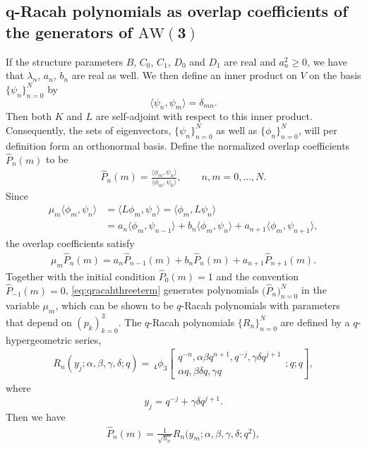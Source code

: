 \documentclass[pdftex]{sigma}
\numberwithin{equation}{section}
\newcommand{\aw}{\mathrm{AW}\!\left(3\right)}
\newcommand{\qhyp}[5]{\,_{#1}\phi_{#2} \left[ \begin{matrix}
		#3 \\ #4 \end{matrix};#5 \right]}
\begin{document}
\subsection[q-Racah polynomials as overlap coefficients of the generators of AW(3)]{$\boldsymbol{q}$-Racah polynomials as overlap coefficients of the generators of $\boldsymbol{\aw}$} \label{ssec:q-Racah pol}
If the structure parameters $B$, $C_0$, $C_1$, $D_0$ and $D_1$ are real and $a_n^2\geq 0$, we have that $\lambda_n$, $a_n$, $b_n$ are real as well. We then define an inner product on $V$ on the basis $\{\psi_n\}_{n=0}^N$ by
\[
\langle \psi_n,\psi_m\rangle=\delta_{mn}.
\]
Then both $K$ and $L$ are self-adjoint with respect to this inner product. Consequently, the sets of eigenvectors, $\{\psi_n\}_{n=0}^N$ as well as $\{\phi_n\}_{n=0}^N$, will per definition form an orthonormal basis. Define the normalized overlap coefficients $\widehat{P}_n(m)$ to be
\begin{align*}
	\widehat{P}_n(m)=\frac{\langle\phi_m,\psi_n\rangle}{\langle\phi_m,\psi_0\rangle},\qquad n,m=0,\ldots,N.
\end{align*}
Since
\begin{align}
\mu_m\langle\phi_m,\psi_n\rangle & =\langle L\phi_m, \psi_n\rangle =\langle \phi_m, L\psi_n\rangle\nonumber\\
		&=a_n\langle \phi_m,\psi_{n-1}\rangle+b_n\langle \phi_m,\psi_{n}\rangle+a_{n+1}\langle \phi_m,\psi_{n+1}\rangle, \label{eq:origin3term}
\end{align}
the overlap coefficients satisfy
\begin{gather}
	\mu_m \widehat{P}_{n}(m)= a_n \widehat{P}_{n-1}(m) + b_n \widehat{P}_{n}(m) + a_{n+1}\widehat{P}_{n+1}(m).\label{eq:qracahthreeterm}
\end{gather}
Together with the initial condition $\widehat{P}_0(m)=1$ and the convention $\widehat{P}_{-1}(m)=0$, \eqref{eq:qracahthreeterm} generates polynomials $\big(\widehat{P}_n\big)_{n=0}^N$ in the variable $\mu_m$, which can be shown \cite{Zhedanov1991} to be $q$-Racah polynomials with parameters that depend on $(p_k)_{k=0}^3$. The $q$-Racah polynomials $\{R_n\}_{n=0}^N$ are defined \cite{KLS} by a $q$-hypergeometric series,
\begin{gather}
	R_n(y_j;\alpha,\beta,\gamma,\delta;q)=\qhyp{4}{3}{q^{-n},\alpha\beta q^{n+1},q^{-j},\gamma\delta q^{j+1}}{\alpha q,\beta\delta q,\gamma q}{q;q}, \label{eq:defqracah}
\end{gather}
where
\[
y_j=q^{-j}+\gamma\delta q^{j+1}.
\]	
Then we have
\begin{gather}
	\widehat{P}_n(m)= \frac{1}{\sqrt{h_n}} R_n\big(y_m;\alpha,\beta,\gamma,\delta;q^2\big),\label{eq:overlapqracah1}
\end{gather}
\end{document}
